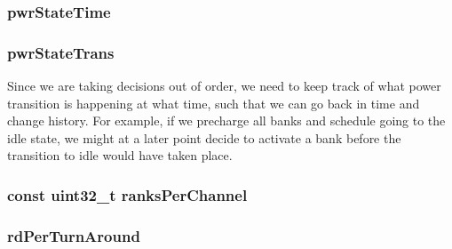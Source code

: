 \label{classDRAMCtrl_a06e80ba25d388ee981f9c88e27e189df}
\hypertarget{classDRAMCtrl_ad084b0fe354d053d0f369a72b8559291}{
\subsubsection[{pwrStateTime}]{ {\bf pwrStateTime}}}
\label{classDRAMCtrl_ad084b0fe354d053d0f369a72b8559291}
\hypertarget{classDRAMCtrl_ab31f48c472ee16c28fc62b8be41b740e}{
\subsubsection[{pwrStateTrans}]{ {\bf pwrStateTrans}}}
\label{classDRAMCtrl_ab31f48c472ee16c28fc62b8be41b740e}
Since we are taking decisions out of order, we need to keep track of what power transition is happening at what time, such that we can go back in time and change history. For example, if we precharge all banks and schedule going to the idle state, we might at a later point decide to activate a bank before the transition to idle would have taken place. \hypertarget{classDRAMCtrl_afb57a2b8af54b8949b2c14434c74bd98}{
\subsubsection[{ranksPerChannel}]{\setlength{\rightskip}{0pt plus 5cm}const {\bf uint32\_\-t} {\bf ranksPerChannel}}}
\label{classDRAMCtrl_afb57a2b8af54b8949b2c14434c74bd98}
\hypertarget{classDRAMCtrl_aff56c8c0df213e51ad714cb2b0df2de3}{
\subsubsection[{rdPerTurnAround}]{ {\bf rdPerTurnAround}}}
